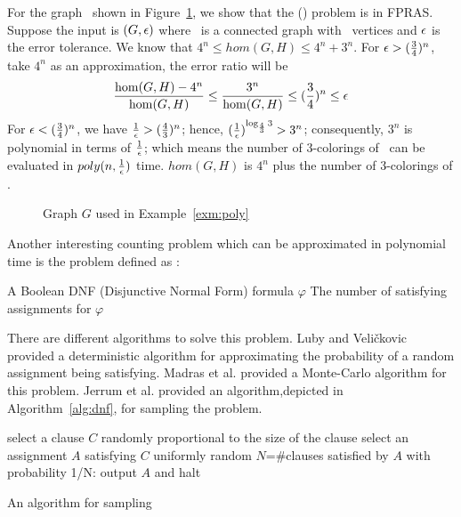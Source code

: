 \begin{example} \label{exp:poly}
For the graph \mH\ shown in Figure~\ref{fig:approxible},
we show that the \chom(\mH) problem is in FPRAS\@. Suppose the input is 
\((G,\epsilon)\) where \mG\ is a connected graph with \mn\ vertices and \(\epsilon\)
is the error tolerance.
We know that 
\(4^n\le hom(G,H) \le 4^n+3^n\)\@.
For \(\epsilon > (\frac{3}{4})^n\), take \(4^n\) as an approximation, the error ratio will  be
\[\frac{\hom(G,H)-4^n}{\hom(G,H)} \le \frac{3^n}{\hom(G,H)} \le (\frac{3}{4})^n \le \epsilon\]
For \(\epsilon < (\frac{3}{4})^n\), we have \(\frac{1}{\epsilon}>(\frac{4}{3})^n \);
hence, \((\frac{1}{\epsilon})^{\log_{\frac{4}{3}}3} > 3^n\); consequently, \(3^n\) is polynomial 
in terms of \(\frac{1}{\epsilon}\); which means the number of 3-colorings of \mG\ can be evaluated in 
\(poly(n,\frac{1}{\epsilon})\) time. 
\(hom(G,H)\) is \(4^n\) plus the number of 3-colorings of \mG\@.

\begin{figure}[h]
\center
\caption{Graph \ensuremath{G} used in Example~\ref{exm:poly}}
\label{fig:approxible}
\end{figure}
\end{example}

Another interesting counting problem which can be approximated in polynomial time is 
the  problem defined as :

\pnndef %
{A Boolean DNF (Disjunctive Normal Form) formula \(\varphi\)}
{The number of satisfying assignments for \(\varphi\)}

There are different algorithms to solve this problem.
Luby and Veli\v{c}kovic \cite{Luby} provided a deterministic algorithm for
approximating the probability of a random assignment being satisfying. 
Madras et al. \cite{Madras} provided a Monte-Carlo algorithm
for this problem. Jerrum et al. \cite{JVV} provided an algorithm,depicted in Algorithm~\ref{alg:dnf},
for sampling the  problem. 
\begin{algorithm}[h]
\begin{algorithmic}
	\STATE  select a clause \(C\) randomly proportional to the size of the clause
	\STATE  select an assignment \(A\) satisfying \(C\) uniformly random
	\STATE  \(N\)=\#clauses satisfied by \(A\)
	\STATE with probability 1/N: output \(A\) and halt
\ENDWHILE
\end{algorithmic}
\caption{An algorithm for sampling }\label{alg:dnf}
\end{algorithm}

